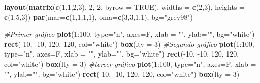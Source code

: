 \documentclass[]{article}
\newenvironment{Shaded}{\begin{snugshade}}{\end{snugshade}}
\newcommand{\KeywordTok}[1]{\textcolor[rgb]{0.13,0.29,0.53}{\textbf{{#1}}}}
\newcommand{\DataTypeTok}[1]{\textcolor[rgb]{0.13,0.29,0.53}{{#1}}}
\newcommand{\DecValTok}[1]{\textcolor[rgb]{0.00,0.00,0.81}{{#1}}}
\newcommand{\FloatTok}[1]{\textcolor[rgb]{0.00,0.00,0.81}{{#1}}}
\newcommand{\StringTok}[1]{\textcolor[rgb]{0.31,0.60,0.02}{{#1}}}
\newcommand{\CommentTok}[1]{\textcolor[rgb]{0.56,0.35,0.01}{\textit{{#1}}}}
\newcommand{\OtherTok}[1]{\textcolor[rgb]{0.56,0.35,0.01}{{#1}}}
\newcommand{\NormalTok}[1]{{#1}}
\begin{document}
\begin{Shaded}
\begin{Highlighting}[]
\KeywordTok{layout}\NormalTok{(}\KeywordTok{matrix}\NormalTok{(}\KeywordTok{c}\NormalTok{(}\DecValTok{1}\NormalTok{,}\DecValTok{1}\NormalTok{,}\DecValTok{2}\NormalTok{,}\DecValTok{3}\NormalTok{), }\DecValTok{2}\NormalTok{, }\DecValTok{2}\NormalTok{, }\DataTypeTok{byrow =} \OtherTok{TRUE}\NormalTok{), }
       \DataTypeTok{widths =} \KeywordTok{c}\NormalTok{(}\DecValTok{2}\NormalTok{,}\DecValTok{3}\NormalTok{), }\DataTypeTok{heights =} \KeywordTok{c}\NormalTok{(}\FloatTok{1.5}\NormalTok{,}\DecValTok{3}\NormalTok{))}
\KeywordTok{par}\NormalTok{(}\DataTypeTok{mar=}\KeywordTok{c}\NormalTok{(}\DecValTok{1}\NormalTok{,}\DecValTok{1}\NormalTok{,}\DecValTok{1}\NormalTok{,}\DecValTok{1}\NormalTok{), }\DataTypeTok{oma=}\KeywordTok{c}\NormalTok{(}\DecValTok{3}\NormalTok{,}\DecValTok{3}\NormalTok{,}\DecValTok{1}\NormalTok{,}\DecValTok{1}\NormalTok{), }\DataTypeTok{bg=}\StringTok{"grey98"}\NormalTok{)}

\CommentTok{#Primer gráfico}
\KeywordTok{plot}\NormalTok{(}\DecValTok{1}\NormalTok{:}\DecValTok{100}\NormalTok{, }\DataTypeTok{type=}\StringTok{"n"}\NormalTok{, }\DataTypeTok{axes=}\NormalTok{F, }\DataTypeTok{xlab =} \StringTok{""}\NormalTok{, }\DataTypeTok{ylab=}\StringTok{""}\NormalTok{, }\DataTypeTok{bg=}\StringTok{"white"}\NormalTok{)}
\KeywordTok{rect}\NormalTok{(-}\DecValTok{10}\NormalTok{, -}\DecValTok{10}\NormalTok{, }\DecValTok{120}\NormalTok{, }\DecValTok{120}\NormalTok{, }\DataTypeTok{col=}\StringTok{"white"}\NormalTok{)}
\KeywordTok{box}\NormalTok{(}\DataTypeTok{lty =} \DecValTok{3}\NormalTok{)}
\CommentTok{#Segundo gráfico}
\KeywordTok{plot}\NormalTok{(}\DecValTok{1}\NormalTok{:}\DecValTok{100}\NormalTok{, }\DataTypeTok{type=}\StringTok{"n"}\NormalTok{, }\DataTypeTok{axes=}\NormalTok{F, }\DataTypeTok{xlab =} \StringTok{""}\NormalTok{, }\DataTypeTok{ylab=}\StringTok{""}\NormalTok{, }\DataTypeTok{bg=}\StringTok{"white"}\NormalTok{)}
\KeywordTok{rect}\NormalTok{(-}\DecValTok{10}\NormalTok{, -}\DecValTok{10}\NormalTok{, }\DecValTok{120}\NormalTok{, }\DecValTok{120}\NormalTok{, }\DataTypeTok{col=}\StringTok{"white"}\NormalTok{)}
\KeywordTok{box}\NormalTok{(}\DataTypeTok{lty =} \DecValTok{3}\NormalTok{)}
\CommentTok{#tercer gráfico}
\KeywordTok{plot}\NormalTok{(}\DecValTok{1}\NormalTok{:}\DecValTok{100}\NormalTok{, }\DataTypeTok{type=}\StringTok{"n"}\NormalTok{, }\DataTypeTok{axes=}\NormalTok{F, }\DataTypeTok{xlab =} \StringTok{""}\NormalTok{, }\DataTypeTok{ylab=}\StringTok{""}\NormalTok{, }\DataTypeTok{bg=}\StringTok{"white"}\NormalTok{)}
\KeywordTok{rect}\NormalTok{(-}\DecValTok{10}\NormalTok{, -}\DecValTok{10}\NormalTok{, }\DecValTok{120}\NormalTok{, }\DecValTok{120}\NormalTok{, }\DataTypeTok{col=}\StringTok{"white"}\NormalTok{)}
\KeywordTok{box}\NormalTok{(}\DataTypeTok{lty =} \DecValTok{3}\NormalTok{)}
\end{Highlighting}
\end{Shaded}
\end{document}

